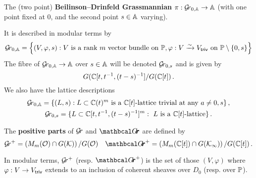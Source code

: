 \documentclass[draft]{article}
\begin{document}
    \begin{definition} 
        The (two point) \textbf{Beilinson--Drinfeld Grassmannian} $\pi : \Grbd\to \AA$ (with one point fixed at 0, and the second point $s\in\AA$ varying).
    \end{definition}
    It is described in modular terms by 
    $$
     \Grbd = 
        \left\{ 
            (V,\varphi,s) : V\text{ is a rank $m$ vector bundle on }\PP, \varphi : V \xrightarrow{\sim} \Vtriv \text{ on } \PP \setminus \{0, s\}  
        \right\} 
    $$%
    The fibre of $\Grbd \to \AA$ over $ s \in \AA $ will be denoted $ \Gr_{0,s} $ and is given by
    $$ 
    G(\CC[t, t^{-1}, (t-s)^{-1}]/G(\CC[t])\,. %
    $$
    We also have the lattice descriptions 
    \begin{gather*}
    \Grbd = 
    \{ (L,s) :
    \text{$L \subset  \CC(t)^m$ is a $\CC[t]$-lattice trivial at any $ a \ne 0, s$} \}\,, \\
     \Gr_{0,s} = 
    \{ L \subset  \CC[t,t^{-1},(t-s)^{-1}]^m : \text{ $L$ is a $\CC[t]$-lattice} \}\,.
    \end{gather*}%
    \begin{definition} 
    The \textbf{positive parts} of $\Gr $ and $\Grth$ are defined by 
    $$
        \Gr^+ = \left(M_m(\cO) \cap G(\cK)\right) / G(\cO) \quad        
        {\Grth}^+ = \left(M_m(\CC[t]) \cap G(\Kinf)\right) / G(\CC[t])\,. 
    $$
    \end{definition}
    In modular terms, $\Gr^+$ (resp. ${\Grth}^+$) is the set of those $ (V, \varphi)$ where $ \varphi : V \rightarrow \Vtriv $ extends to an inclusion of coherent sheaves over $ D_0 $ (resp. over $ \PP$).
    
\end{document}
